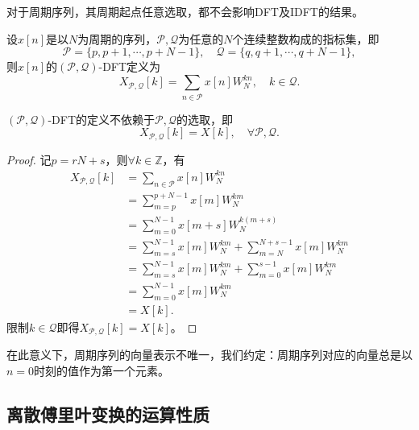 对于周期序列，其周期起点任意选取，都不会影响DFT及IDFT的结果。
\begin{definition}
    设$x[n]$是以$N$为周期的序列，$\mathcal{P},\mathcal{Q}$为任意的$N$个连续整数构成的指标集，即
    \begin{equation}
        \mathcal{P}=\{p,p+1,\cdots,p+N-1\},\quad \mathcal{Q}=\{q,q+1,\cdots,q+N-1\},
    \end{equation}
    则$x[n]$的$(\mathcal{P},\mathcal{Q})$-DFT定义为
    \begin{equation}
        X_{\mathcal{P},\mathcal{Q}}[k]=\sum_{n\in\mathcal{P}}x[n]W_N^{kn},\quad k\in\mathcal{Q}.
    \end{equation}
\end{definition}
\begin{proposition}
    $(\mathcal{P},\mathcal{Q})$-DFT的定义不依赖于$\mathcal{P},\mathcal{Q}$的选取，即
    \begin{equation}
        X_{\mathcal{P},\mathcal{Q}}[k]=X[k],\quad \forall \mathcal{P},\mathcal{Q}.
    \end{equation}
\end{proposition}
\begin{proof}
    记$p=rN+s$，则$\forall k\in\mathbb{Z}$，有
    \begin{align}
        X_{\mathcal{P},\mathcal{Q}}[k]&=\sum_{n\in\mathcal{P}}x[n]W_N^{kn} \nonumber \\
        &=\sum_{m=p}^{p+N-1}x[m]W_N^{km} \nonumber \\
        &=\sum_{m=0}^{N-1}x[m+s]W_N^{k(m+s)} \nonumber \\
        &=\sum_{m=s}^{N-1}x[m]W_N^{km}+\sum_{m=N}^{N+s-1}x[m]W_N^{km} \nonumber \\
        &=\sum_{m=s}^{N-1}x[m]W_N^{km}+\sum_{m=0}^{s-1}x[m]W_N^{km} \nonumber \\
        &=\sum_{m=0}^{N-1}x[m]W_N^{km} \nonumber \\
        &=X[k].
    \end{align}
    限制$k\in\mathcal{Q}$即得$X_{\mathcal{P},\mathcal{Q}}[k]=X[k]$。
\end{proof}

在此意义下，周期序列的向量表示不唯一，我们约定：周期序列对应的向量总是以$n=0$时刻的值作为第一个元素。

\subsection{离散傅里叶变换的运算性质}\label{sub:property_of_DFT}

